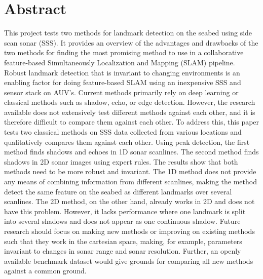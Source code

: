 \chapter*{Abstract}

This project tests two methods for landmark detection on the seabed using side scan sonar (SSS). It provides an overview of the advantages and drawbacks of the two methods for finding the most promising method to use in a collaborative feature-based Simultaneously Localization and Mapping (SLAM) pipeline. Robust landmark detection that is invariant to changing environments is an enabling factor for doing feature-based SLAM using an inexpensive SSS and sensor stack on AUV’s. Current methods primarily rely on deep learning or classical methods such as shadow, echo, or edge detection. However, the research available does not extensively test different methods against each other, and it is therefore difficult to compare them against each other. To address this, this paper tests two classical methods on SSS data collected from various locations and qualitatively compares them against each other. Using peak detection, the first method finds shadows and echoes in 1D sonar scanlines. The second method finds shadows in 2D sonar images using expert rules. The results show that both methods need to be more robust and invariant. The 1D method does not provide any means of combining information from different scanlines, making the method detect the same feature on the seabed as different landmarks over several scanlines. The 2D method, on the other hand, already works in 2D and does not have this problem. However, it lacks performance where one landmark is split into several shadows and does not appear as one continuous shadow. Future research should focus on making new methods or improving on existing methods such that they work in the cartesian space, making, for example, parameters invariant to changes in sonar range and sonar resolution. Further, an openly available benchmark dataset would give grounds for comparing all new methods against a common ground. 